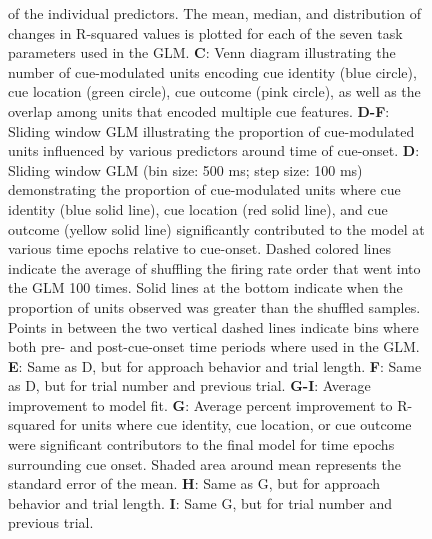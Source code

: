 \documentclass[11pt]{article}
\newcommand{\bsf}[1]{\textbf{#1}}
\begin{document}
\begin{figure}[ht!]
{  of the individual predictors. The mean, median, and distribution of
  changes in R-squared values is plotted for each of the seven task
  parameters used in the GLM. \bsf{C}: Venn diagram illustrating the
  number of cue-modulated units encoding cue identity (blue circle),
  cue location (green circle), cue outcome (pink circle), as well as
  the overlap among units that encoded multiple cue
  features. \bsf{D-F}: Sliding window GLM illustrating the proportion
  of cue-modulated units influenced by various predictors around time
  of cue-onset. \bsf{D}: Sliding window GLM (bin size: 500 ms; step
  size: 100 ms) demonstrating the proportion of cue-modulated units
  where cue identity (blue solid line), cue location (red solid line),
  and cue outcome (yellow solid line) significantly contributed to the
  model at various time epochs relative to cue-onset. Dashed colored
  lines indicate the average of shuffling the firing rate order that
  went into the GLM 100 times. Solid lines at the bottom indicate when
  the proportion of units observed was greater than the shuffled
  samples. Points in between the two vertical dashed lines indicate
  bins where both pre- and post-cue-onset time periods where used in
  the GLM. \bsf{E}: Same as D, but for approach behavior and trial
  length. \bsf{F}: Same as D, but for trial number and previous
  trial. \bsf{G-I}: Average improvement to model fit. \bsf{G}: Average
  percent improvement to R-squared for units where cue identity, cue
  location, or cue outcome were significant contributors to the final
  model for time epochs surrounding cue onset. Shaded area around mean
  represents the standard error of the mean. \bsf{H}: Same as G, but
  for approach behavior and trial length. \bsf{I}: Same G, but for
  trial number and previous trial.}
\label{fig:GLM}
\end{figure} \clearpage
\end{document}
